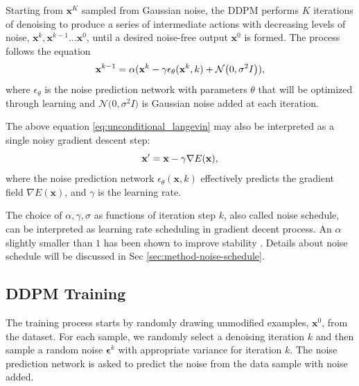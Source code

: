 Starting from $\mathbf{x}^K$ sampled from Gaussian noise, the DDPM performs $K$ iterations of denoising to produce a series of intermediate actions with decreasing levels of noise,
$\mathbf{x}^k, \mathbf{x}^{k-1} ...\mathbf{x}^{0} $, until a desired noise-free output $\mathbf{x}^0$ is formed.
The process follows the equation
\vspace{-1mm}
\begin{equation}
    \textbf{x}^{k-1}=\alpha(\textbf{x}^{k}-\gamma\epsilon_\theta(\mathbf{x}^k,k) + \mathcal{N} \bigl(0, \sigma^2 I \bigl)),
    \label{eq:unconditional_langevin}
\vspace{-1mm}
\end{equation}
where $\epsilon_\theta$ is the noise prediction network with parameters $\theta$ that will be optimized through learning and $\mathcal{N} \bigl(0, \sigma^2 I \bigl)$ is Gaussian noise added at each iteration.


The above equation \ref{eq:unconditional_langevin} may also be interpreted as a single noisy gradient descent step:
\vspace{-2mm}
\begin{equation}
    \mathbf{x}'=\mathbf{x}-\gamma\nabla E(\mathbf{x}),
    \label{eq:gradient_descent}
\vspace{-1mm}
\end{equation}
where the noise prediction network $\epsilon_\theta(\mathbf{x},k)$ effectively predicts the gradient field $\nabla E(\mathbf{x})$, and  $\gamma$ is the learning rate.

The choice of $\alpha,\gamma,\sigma$ as functions of iteration step $k$, also called noise schedule, can be interpreted as learning rate scheduling in gradient decent process.
An $\alpha$ slightly smaller than $1$ has been shown to improve stability \cite{ho2020denoising}.
Details about noise schedule will be discussed in Sec \ref{sec:method-noise-schedule}.


\subsection{DDPM Training}
\label{sec:ddpm_inference}


The training process starts by randomly drawing unmodified examples, $\mathbf{x}^0$, from the dataset. For each sample, we randomly select a denoising iteration $k$ and then sample a random noise $\mathbf{\epsilon}^k$ with appropriate variance for iteration $k$. The noise prediction network is asked to predict the noise from the data sample with noise added.

